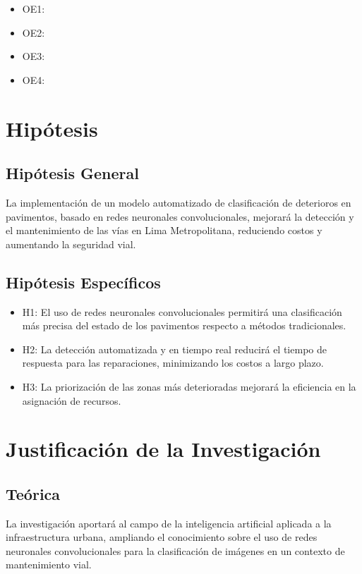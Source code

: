	\begin{itemize}
		\item OE1: {\Objone}
		\item OE2: {\Objtwo}
		\item OE3: {\Objthree}
		\item OE4: {\Objfour}
	\end{itemize}

	\section{Hipótesis}
	
	\subsection{Hipótesis General}
	La implementación de un modelo automatizado de clasificación de deterioros en pavimentos, basado en redes neuronales convolucionales, mejorará la detección y el mantenimiento de las vías en Lima Metropolitana, reduciendo costos y aumentando la seguridad vial.
	\subsection{Hipótesis Específicos}

	\newcommand{\Hione}{
	El uso de redes neuronales convolucionales permitirá una clasificación más precisa del estado de los pavimentos respecto a métodos tradicionales.}
	\newcommand{\Hitwo}{
	La detección automatizada y en tiempo real reducirá el tiempo de respuesta para las reparaciones, minimizando los costos a largo plazo.}
	\newcommand{\Hithree}{
	La priorización de las zonas más deterioradas mejorará la eficiencia en la asignación de recursos.}
	

	\begin{itemize}
		\item H1: {\Hione}
		\item H2: {\Hitwo}
		\item H3: {\Hithree}
	\end{itemize}


	\section{Justificación de la Investigación}

	\subsection{Teórica}
	La investigación aportará al campo de la inteligencia artificial aplicada a la infraestructura urbana, ampliando el conocimiento sobre el uso de redes neuronales convolucionales para la clasificación de imágenes en un contexto de mantenimiento vial.

